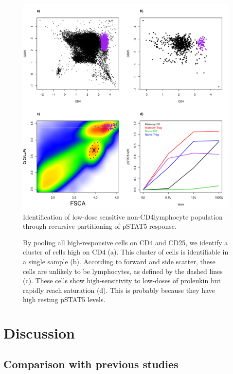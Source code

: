 \hspace{-2cm}
\begin{figure}[h]
\centering
\includegraphics[scale=.5]{figures/new-cell-subset.pdf}
{ Identification of low-dose sensitive non-CD4\positive lymphocyte population through recursive partitioning of pSTAT5 response. }
{
  By pooling all high-responsive cells on CD4 and CD25, we identify a cluster of cells high on CD4 (a).
  This cluster of cells is identifiable in a single sample (b).
  According to forward and side scatter, these cells are unlikely to be lymphocytes, as defined by the dashed lines (c).
  These cells show high-sensitivity to low-doses of proleukin but rapidly reach saturation (d).
  This is probably because they have high resting pSTAT5 levels.
  
}
\end{figure}




\section{Discussion}

\subsection{Comparison with previous studies}

